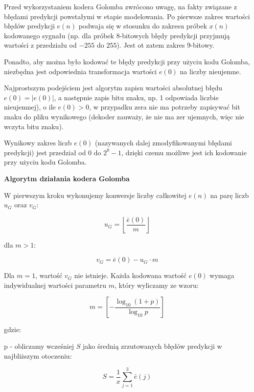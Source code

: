 \documentclass{article}
\begin{document}
Przed wykorzystaniem kodera Golomba zwrócono uwagę, na fakty związane z błędami predykcji powstałymi w etapie modelowania. Po pierwsze zakres wartości błędów predykcji $e(n)$ podwaja się w stosunku do zakresu próbek $x(n)$ kodowanego sygnału (np. dla próbek 8-bitowych błędy predykcji przyjmują wartości z przedziału od $-255$ do $255$). Jest ot zatem zakres 9-bitowy.

Ponadto, aby można było kodować te błędy predykcji przy użyciu kodu Golomba, niezbędna jest odpowiednia transformacja wartości $e(0)$ na liczby nieujemne.

Najprostszym podejściem jest algorytm zapisu wartości absolutnej błędu $e(0)=|e(0)|$, a następnie zapis bitu znaku, np. 1 odpowiada liczbie nieujemnej), o ile $e(0)>0$, w przypadku zera nie ma potrzeby zapisywać bit znaku do pliku wynikowego (dekoder zauważy, że nie ma zer ujemnych, więc nie wczyta bitu znaku).

Wynikowy zakres liczb $e(0)$ (nazywanych dalej zmodyfikowanymi błędami predykcji) jest przedział od $0$ do $2^8 - 1$, dzięki czemu możliwe jest ich kodowanie przy użyciu kodu Golomba.


\textbf{Algorytm działania kodera Golomba}

W pierwszym kroku wykonujemy konwersje liczby całkowitej $e(n)$ na parę liczb $u_G$ oraz $v_G$:
	
\begin{equation}
u_{G}=\left\lfloor\frac{\bar{e}(0)}{m}\right\rfloor
\end{equation}	
	
dla $m > 1$:
	
\begin{equation}
v_{G}=\bar{e}(0)-u_{G} \cdot m
\end{equation}	
	
Dla $m = 1$, wartość $v_G$ nie istnieje. Każda kodowana wartość $e(0)$ wymaga indywidualnej wartości parametru $m$, który wyliczamy ze wzoru:
	
\begin{equation}
m=\left[-\frac{\log_{10}(1+p)}{\log_{10} p}\right]
\end{equation}
	
gdzie:

p - obliczamy wcześniej $S$ jako średnią zrzutowanych błędów predykcji w najbliższym otoczeniu:
	
\begin{equation}
S=\frac{1}{x} \sum_{j=1}^{3} \bar{e}(j)
\end{equation}
	
\end{document}
